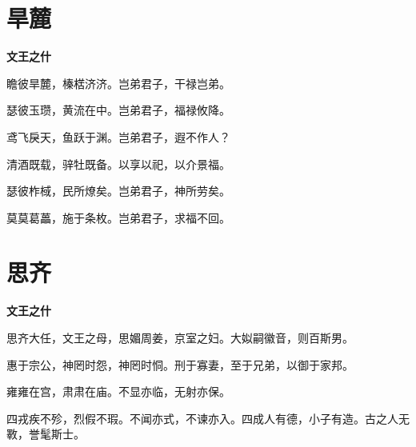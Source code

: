 \documentclass[12pt,a4paper]{ctexbook}
\begin{document}
\section{旱麓}
\textbf{文王之什}\par\vspace{0.5em}
瞻彼旱麓，榛楛济济。岂弟君子，干禄岂弟。\par
瑟彼玉瓒，黄流在中。岂弟君子，福禄攸降。\par
鸢飞戾天，鱼跃于渊。岂弟君子，遐不作人？\par
清酒既载，骍牡既备。以享以祀，以介景福。\par
瑟彼柞棫，民所燎矣。岂弟君子，神所劳矣。\par
莫莫葛藟，施于条枚。岂弟君子，求福不回。\par

\section{思齐}
\textbf{文王之什}\par\vspace{0.5em}
思齐大任，文王之母，思媚周姜，京室之妇。大姒嗣徽音，则百斯男。\par
惠于宗公，神罔时怨，神罔时恫。刑于寡妻，至于兄弟，以御于家邦。\par
雍雍在宫，肃肃在庙。不显亦临，无射亦保。\par
四戎疾不殄，烈假不瑕。不闻亦式，不谏亦入。四成人有德，小子有造。古之人无斁，誉髦斯士。\par
\end{document}
